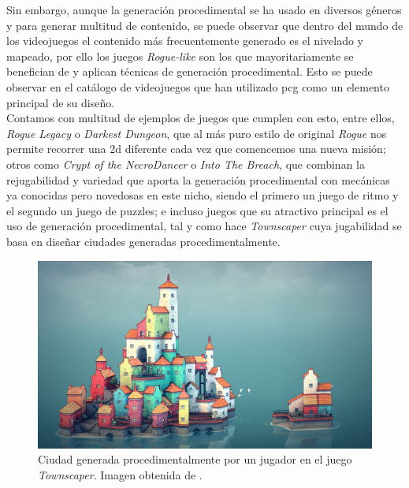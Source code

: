 Sin embargo, aunque la generación procedimental se ha usado en diversos géneros y para generar multitud de contenido, se puede observar que dentro del mundo de los videojuegos el contenido más frecuentemente generado es el nivelado y mapeado, por ello los juegos \textit{Rogue-like} son los que mayoritariamente se benefician de y aplican técnicas de generación procedimental. Esto se puede observar en el catálogo de videojuegos que han utilizado \acrshort{pcg} como un elemento principal de su diseño.\\

Contamos con multitud de ejemplos de juegos que cumplen con esto, entre ellos, \textit{Rogue Legacy} o \textit{Darkest Dungeon}, que al más puro estilo de original \textit{Rogue} nos permite recorrer una \acrshort{2d} diferente cada vez que comencemos una nueva misión; otros como \textit{Crypt of the NecroDancer} o \textit{Into The Breach}, que combinan la rejugabilidad y variedad que aporta la generación procedimental con mecánicas ya conocidas pero novedosas en este nicho, siendo el primero un juego de ritmo y el segundo un juego de puzzles; e incluso juegos que su atractivo principal es el uso de generación procedimental, tal y como hace \textit{Townscaper} cuya jugabilidad se basa en diseñar ciudades generadas procedimentalmente.\\

\begin{figure}[H]
    \begin{center}
        \includegraphics[scale=0.4]{img/town.jpg}
        \caption{Ciudad generada procedimentalmente por un jugador en el juego \textit{Townscaper}. Imagen obtenida de \cite{oscar}.}
    \end{center}
\end{figure}